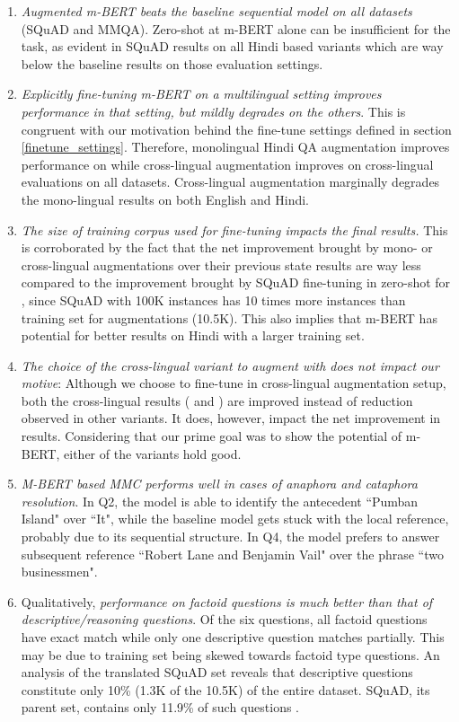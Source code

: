 \documentclass[acmsmall]{acmart}
\begin{document}
\begin{enumerate}
    \item \textit{Augmented m-BERT beats the baseline sequential model on all datasets} (SQuAD and MMQA). Zero-shot at m-BERT alone can be insufficient for the task, as evident in SQuAD results on all Hindi based variants which are way below the baseline results on those evaluation settings. 
    \item \textit{Explicitly fine-tuning m-BERT on a multilingual setting improves performance in that setting, but mildly degrades on the others}. This is  congruent with our motivation behind the fine-tune settings defined in section \ref{finetune_settings}. Therefore, monolingual Hindi QA augmentation improves performance on  while cross-lingual augmentation improves on cross-lingual evaluations on all datasets. Cross-lingual augmentation marginally degrades the mono-lingual results on both English and Hindi.  
    \item \textit{The size of training corpus used for fine-tuning impacts the final results.} This is corroborated by the fact that the net improvement brought by mono- or cross-lingual augmentations over their previous state results are way less compared to the improvement brought by SQuAD fine-tuning in zero-shot for , since SQuAD with 100K instances has 10 times more instances than training set for augmentations (10.5K). This also implies that m-BERT has potential for better results on Hindi with a larger training set.
    \item \textit{The choice of the cross-lingual variant to augment with does not impact our motive}: Although we choose  to fine-tune in cross-lingual augmentation setup, both the cross-lingual results ( and ) are improved instead of reduction observed in other variants. It does, however, impact the net improvement in results. Considering that our prime goal was to show the potential of m-BERT, either of the variants hold good. 
    \item \textit{M-BERT based MMC performs well in cases of anaphora and cataphora resolution}. In Q2, the model is able to identify the antecedent ``Pumban Island" over ``It", while the baseline model gets stuck with the local reference, probably due to its sequential structure. In Q4, the model prefers to answer subsequent reference ``Robert Lane and Benjamin Vail" over the phrase ``two businessmen".
    \item Qualitatively, \textit{performance on factoid questions is much better than that of descriptive/reasoning questions}. Of the six questions, all factoid questions have exact match while only one descriptive question matches partially. This may be due to training set being skewed towards factoid type questions. An analysis of the translated SQuAD set reveals that descriptive questions constitute only 10\% (1.3K of the 10.5K) of the entire dataset. SQuAD, its parent set, contains only 11.9\% of such questions \cite{squad}.

\end{enumerate}
\end{document}
